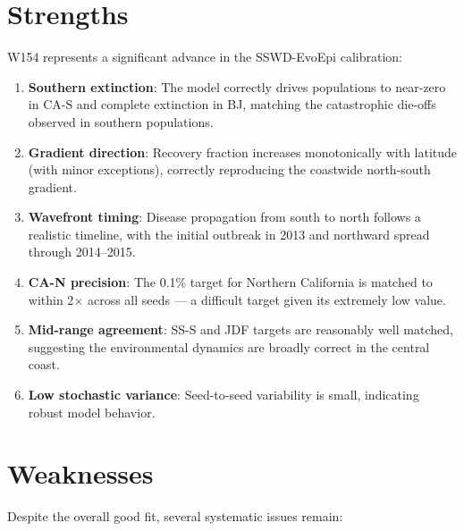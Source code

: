 \documentclass[11pt]{article}
\begin{document}
\section{Strengths}

W154 represents a significant advance in the SSWD-EvoEpi calibration:

\begin{enumerate}
    \item \textbf{Southern extinction}: The model correctly drives populations to near-zero in CA-S and complete extinction in BJ, matching the catastrophic die-offs observed in southern populations.
    \item \textbf{Gradient direction}: Recovery fraction increases monotonically with latitude (with minor exceptions), correctly reproducing the coastwide north-south gradient.
    \item \textbf{Wavefront timing}: Disease propagation from south to north follows a realistic timeline, with the initial outbreak in 2013 and northward spread through 2014--2015.
    \item \textbf{CA-N precision}: The 0.1\% target for Northern California is matched to within 2$\times$ across all seeds --- a difficult target given its extremely low value.
    \item \textbf{Mid-range agreement}: SS-S and JDF targets are reasonably well matched, suggesting the environmental dynamics are broadly correct in the central coast.
    \item \textbf{Low stochastic variance}: Seed-to-seed variability is small, indicating robust model behavior.
\end{enumerate}

\section{Weaknesses}

Despite the overall good fit, several systematic issues remain:
\end{document}
